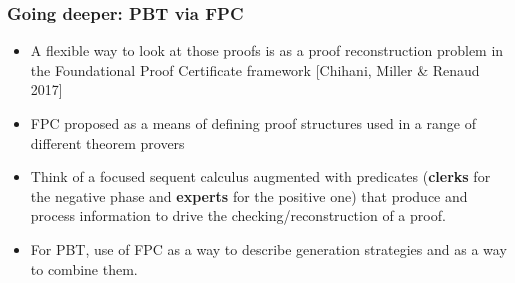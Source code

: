 \documentclass{beamer}
\newcommand{\red}[1]{{\color{red} #1}}
\newenvironment{myslide}[1]
    {\begin{frame}\frametitle{#1}}
    {\end{frame}}
\begin{document}
\begin{myslide}{Going deeper: PBT via FPC}
  \begin{itemize}
  \item A flexible  way to look at those proofs is as a
    \red{proof reconstruction} problem in the \red{Foundational Proof
      Certificate} framework [Chihani, Miller \& Renaud 2017]
\item FPC proposed as a means of defining proof
structures used in a range of different theorem provers
\pause
\item Think of a focused sequent calculus
  augmented with predicates (\textbf{clerks} for the negative phase and \textbf{experts}
  for the positive one) that produce and process information to drive
  the checking/reconstruction of a proof.
\pause
\item For PBT, use of FPC as a way to
describe \red{generation strategies} and as a way to combine them.
  \end{itemize}
  
\end{myslide}
\newcommand{\andd}{\wedge}
\newcommand{\impp}{\supset}
\end{document}
